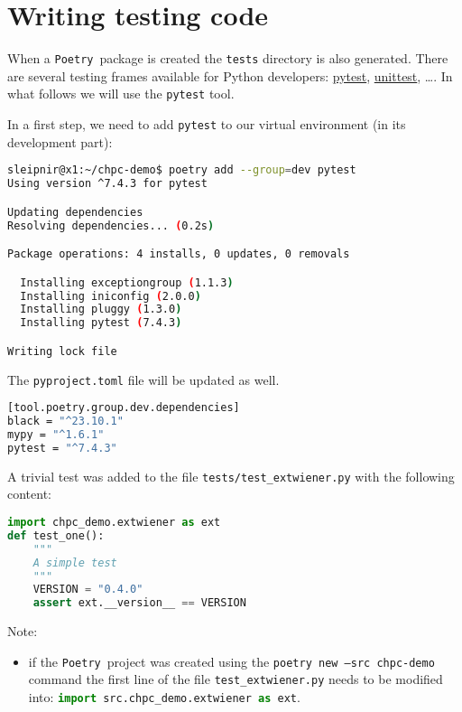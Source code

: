 \documentclass[10pt]{article}
\newcommand{\POETRY}{\texttt{Poetry}}
\begin{document}
\section{Writing testing code}
When a \POETRY\ package is created the \texttt{tests} directory is also generated.
There are several testing frames available for Python developers: \href{https://docs.pytest.org/en/stable/}{pytest}\;\cite{PYTEST:2023}, 
\href{https://docs.python.org/3/library/unittest.html}{unittest}\;\cite{UNITTEST:2023}, \ldots.
In what follows we will use the \texttt{pytest} tool.

In a first step, we need to add \texttt{pytest} to our virtual environment (in its development part):
\begin{lstlisting}[language=bash]
sleipnir@x1:~/chpc-demo$ poetry add --group=dev pytest
Using version ^7.4.3 for pytest

Updating dependencies
Resolving dependencies... (0.2s)

Package operations: 4 installs, 0 updates, 0 removals

  Installing exceptiongroup (1.1.3)
  Installing iniconfig (2.0.0)
  Installing pluggy (1.3.0)
  Installing pytest (7.4.3)

Writing lock file
\end{lstlisting}

The \texttt{pyproject.toml} file will be updated as well.
\begin{lstlisting}[language=bash]
[tool.poetry.group.dev.dependencies]
black = "^23.10.1"
mypy = "^1.6.1"
pytest = "^7.4.3"
\end{lstlisting}

A trivial test was added to the file \texttt{tests/test\_extwiener.py} with the following content:
\begin{lstlisting}[language=python]
import chpc_demo.extwiener as ext
def test_one():
    """
    A simple test
    """
    VERSION = "0.4.0"
    assert ext.__version__ == VERSION
\end{lstlisting}   
Note:
\begin{itemize}
    \item if the \POETRY\ project was created using the \texttt{poetry new --src chpc-demo} command the first line
	    of the file \texttt{test\_extwiener.py} needs to be modified into: \lstinline[language=python]{import src.chpc_demo.extwiener as ext}.
\end{itemize}		
\end{document}
